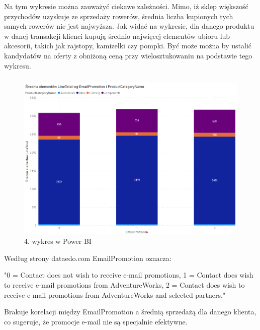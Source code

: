 \documentclass[a4paper,12pt]{article}
\begin{document}
Na tym wykresie można zauważyć ciekawe zależności. Mimo, iż sklep większość przychodów uzyskuje ze sprzedaży rowerów, średnia liczba kupionych tych samych rowerów nie jest najwyższa. Jak widać na wykresie, dla danego produktu w danej transakcji klienci kupują średnio najwięcej elementów ubioru lub akcesorii, takich jak rajstopy, kamizelki czy pompki. Być może można by ustalić kandydatów na oferty z obniżoną ceną przy wielosztukowaniu na podstawie tego wykresu.

\subsubsection{}

\begin{figure}[H]
    \centering
    \includegraphics[width=1.0\textwidth]{images/power_bi/04.png}
    \caption{4. wykres w Power BI}
\end{figure}

Według strony dataedo.com \cite{adventureworks} EmailPromotion oznacza:

"0 = Contact does not wish to receive e-mail promotions, 1 = Contact does wish to receive e-mail promotions from AdventureWorks, 2 = Contact does wish to receive e-mail promotions from AdventureWorks and selected partners."

Brakuje korelacji między EmailPromotion a średnią sprzedażą dla danego klienta, co sugeruje, że promocje e-mail nie są specjalnie efektywne.

\subsubsection{}
\end{document}

